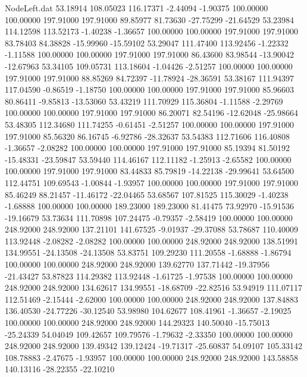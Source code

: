 \begin{filecontents}{NodeLeft.dat}
  53.18914  108.05023  116.17371    -2.44094   -1.90375  100.00000  100.00000  197.91000  197.91000   89.85977   81.73630  -27.75299  -21.64529
  53.23984  114.12598  113.52173    -1.40238   -1.36657  100.00000  100.00000  197.91000  197.91000   83.78403   84.38828  -15.99960  -15.59102
  53.29047  111.47400  113.92456    -1.22332   -1.11588  100.00000  100.00000  197.91000  197.91000   86.43600   83.98544  -13.90042  -12.67963
  53.34105  109.05731  113.18604    -1.04426   -2.51257  100.00000  100.00000  197.91000  197.91000   88.85269   84.72397  -11.78924  -28.36591
  53.38167  111.94397  117.04590    -0.86519   -1.18750  100.00000  100.00000  197.91000  197.91000   85.96603   80.86411   -9.85813  -13.53060
  53.43219  111.70929  115.36804    -1.11588   -2.29769  100.00000  100.00000  197.91000  197.91000   86.20071   82.54196  -12.62048  -25.98664
  53.48305  112.34680  111.74255    -0.61451   -2.51257  100.00000  100.00000  197.91000  197.91000   85.56320   86.16745   -6.92786  -28.32637
  53.54383  112.71606  116.40808    -1.36657   -2.08282  100.00000  100.00000  197.91000  197.91000   85.19394   81.50192  -15.48331  -23.59847
  53.59440  114.46167  112.11182    -1.25913   -2.65582  100.00000  100.00000  197.91000  197.91000   83.44833   85.79819  -14.22138  -29.99641
  53.64500  112.44751  109.69543    -1.00844   -1.93957  100.00000  100.00000  197.91000  197.91000   85.46249   88.21457  -11.46172  -22.04465
  53.68567  107.81525  115.30029    -1.40238   -1.68888  100.00000  100.00000  189.23000  189.23000   81.41475   73.92970  -15.91536  -19.16679
  53.73634  111.70898  107.24475    -0.79357   -2.58419  100.00000  100.00000  248.92000  248.92000  137.21101  141.67525   -9.01937  -29.37088
  53.78687  110.40009  113.92448    -2.08282   -2.08282  100.00000  100.00000  248.92000  248.92000  138.51991  134.99551  -24.13508  -24.13508
  53.83751  109.29230  111.20558    -1.68888   -1.86794  100.00000  100.00000  248.92000  248.92000  139.62770  137.71442  -19.37956  -21.43427
  53.87823  114.29382  113.92448    -1.61725   -1.97538  100.00000  100.00000  248.92000  248.92000  134.62617  134.99551  -18.68709  -22.82516
  53.94919  111.07117  112.51469    -2.15444   -2.62000  100.00000  100.00000  248.92000  248.92000  137.84883  136.40530  -24.77226  -30.12540
  53.98980  104.62677  108.41961    -1.36657   -2.19025  100.00000  100.00000  248.92000  248.92000  144.29323  140.50040  -15.75013  -25.24339
  54.04049  109.42657  109.79576    -1.79632   -2.33350  100.00000  100.00000  248.92000  248.92000  139.49342  139.12424  -19.71317  -25.60837
  54.09107  105.33142  108.78883    -2.47675   -1.93957  100.00000  100.00000  248.92000  248.92000  143.58858  140.13116  -28.22355  -22.10210

\end{filecontents}
